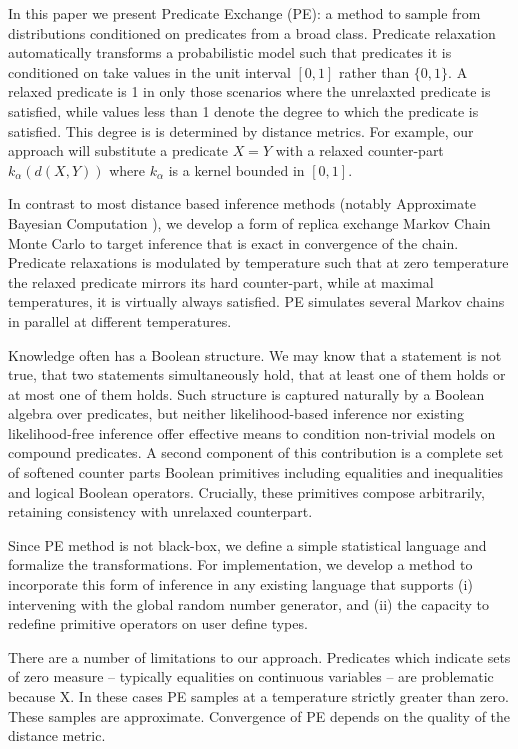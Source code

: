 In this paper we present Predicate Exchange (PE):
a method to sample from distributions conditioned on predicates from a broad class.
Predicate relaxation automatically transforms a probabilistic model such that predicates it is conditioned on take values in the unit interval $[0, 1]$ rather than $\{0, 1\}$.
A relaxed predicate is 1 in only those scenarios where the unrelaxted predicate is satisfied, while values less than 1 denote the degree to which the predicate is satisfied.
This degree is is determined by distance metrics.
For example, our approach will substitute a predicate $X = Y$ with a relaxed counter-part $k_\alpha(d(X, Y))$ where $k_\alpha$ is a kernel bounded in $[0, 1]$.

In contrast to most distance based inference methods (notably Approximate Bayesian Computation \cite{beaumont2002approximate}), we develop a form of replica exchange Markov Chain Monte Carlo \cite{earl2005parallel} to target inference that is exact in convergence of the chain.
Predicate relaxations is modulated by temperature such that at zero temperature the relaxed predicate mirrors its hard counter-part, while at maximal temperatures, it is virtually always satisfied.
PE simulates several Markov chains in parallel at different temperatures.

Knowledge often has a Boolean structure.
We may know that a statement is not true, that two statements simultaneously hold, that at least one of them holds or at most one of them holds.
Such structure is captured naturally by a Boolean algebra over predicates, but neither likelihood-based inference nor existing likelihood-free inference offer effective means to condition non-trivial models on compound predicates.
A second component of this contribution is a complete set of softened counter parts Boolean primitives including equalities and inequalities and logical Boolean operators.
Crucially, these primitives compose arbitrarily, retaining consistency with unrelaxed counterpart.

Since PE method is not black-box, we define a simple statistical language and formalize the transformations.
For implementation, we develop a method to incorporate this form of inference in any existing language that supports (i) intervening with the global random number generator, and (ii) the capacity to redefine primitive operators on user define types.

There are a number of limitations to our approach.
Predicates which indicate sets of zero measure -- typically equalities on continuous variables -- are problematic because X.
In these cases PE samples at a temperature strictly greater than zero.
These samples are approximate.
Convergence of PE depends on the quality of the distance metric.

